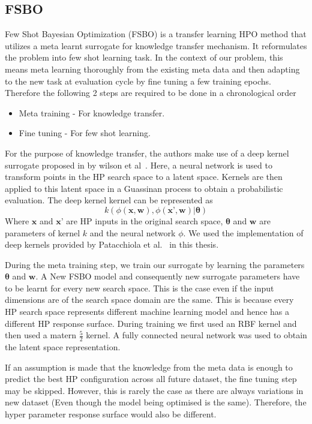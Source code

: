 \documentclass[12pt, twoside, ngerman]{report}
\begin{document}
\subsection{FSBO}
Few Shot Bayesian Optimization (FSBO) is a transfer learning HPO method that utilizes a meta learnt surrogate for knowledge transfer mechanism.
It reformulates the problem into few shot learning task.
In the context of our problem,  this means meta learning thoroughly from the existing meta data and then adapting to the new task at evaluation cycle by fine tuning a few training epochs.
Therefore the following 2 steps are required to be done in a chronological order
\begin{itemize}
\item Meta training - For knowledge transfer.
\item Fine tuning - For few shot learning.
\end{itemize}

For the purpose of knowledge transfer, the authors make use of a deep kernel surrogate proposed in by wilson et al~\cite{pmlr-v51-wilson16}.
Here,  a neural network is used to transform points in the HP search space to a latent space.
Kernels are then applied to this latent space in a Guassinan process to obtain a probabilistic evaluation.
The deep kernel kernel can be represented as~\cite{fsbopaper}
$$
k(\phi(\textbf{x}, \textbf{w})  ,   \phi(\textbf{x'}, \textbf{w}) |  \mathbf{\theta})
$$
Where $\textbf{x}$ and $\textbf{x'}$ are HP inputs in the original search space,
$\mathbf{\theta}$ and $\textbf{w}$ are parameters of kernel $k$ and the neural network $\phi$.
We used the implementation of deep kernels provided by Patacchiola et al.~\cite{patacchiola2020bayesian} in this thesis.

During the meta training step, we train our surrogate by learning the parameters $\mathbf{\theta}$ and $\textbf{w}$.
A New FSBO model and consequently new surrogate parameters have to be learnt for every new search space.
This is the case even if the input dimensions are of the search space domain are the same.
This is because every HP search space represents different machine learning model and hence has a different HP response surface.
During training we first used an RBF kernel and then used a matern $\frac{5}{2}$ kernel.
A fully connected neural network was used to obtain the latent space representation.

If an assumption is made that the knowledge from the meta data is enough to predict the best HP configuration across all future dataset,  the fine tuning step may be skipped.
However,  this is rarely the case as there are always variations in new dataset (Even though the model being optimised is the same).
Therefore,  the hyper parameter response surface would also be different.
\end{document}
